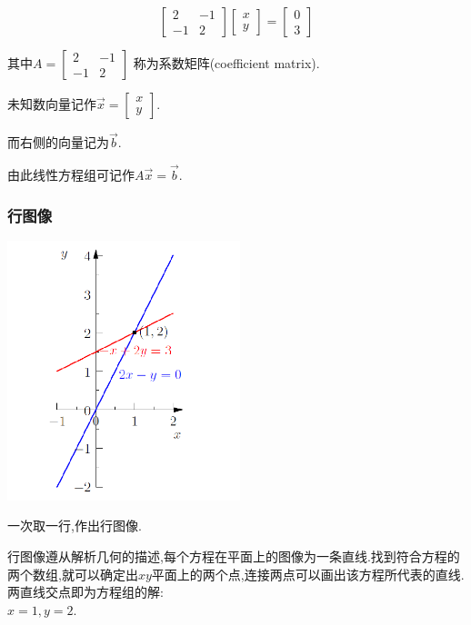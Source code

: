 \documentclass[UTF8,12pt]{ctexbook}
\begin{document}
{{{{{  $$
    \begin{bmatrix}
      2  & -1 \\
      -1 & 2
    \end{bmatrix}
    \begin{bmatrix}
      x \\
      y
    \end{bmatrix}
    =
    \begin{bmatrix}
      0 \\
      3
    \end{bmatrix}
  $$

  其中$A = \begin{bmatrix}
      2  & -1 \\
      -1 & 2
    \end{bmatrix}$
  称为系数矩阵(coefficient matrix).

  未知数向量记作$\vec{x} = \begin{bmatrix}
      x \\
      y
    \end{bmatrix}$.

  而右侧的向量记为$\vec{b}$.

  由此线性方程组可记作$A\vec{x} = \vec{b}$.
}%

\subsubsection{行图像}{
  \begin{multicols}{2}
    {
      \includegraphics{resources/row_picture_1.png}
    }

    {
      一次取一行,作出行图像.

      行图像遵从解析几何的描述,每个方程在平面上的图像为一条直线.找到符合方程的两个数组,就可以确定出$xy$平面上的两个点,连接两点可以画出该方程所代表的直线.两直线交点即为方程组的解:\\$x=1,y=2$.
    }
  \end{multicols}
}%

}}}}
\end{document}

